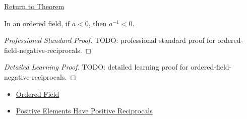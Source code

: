 \newpage
{}
\label{prf:ordered-field-negative-reciprocals}

\begin{remark*}[Return]
\hyperref[thm:ordered-field-negative-reciprocals]{Return to Theorem}
\end{remark*}

\begin{theorem*}
In an ordered field, if $a<0$, then $a^{-1}<0$.
\end{theorem*}

\begin{proof}[Professional Standard Proof]
\LRAProofBodyStart
TODO: professional standard proof for ordered-field-negative-reciprocals.
\end{proof}

\begin{proof}[Detailed Learning Proof]
\LRAProofBodyStart
TODO: detailed learning proof for ordered-field-negative-reciprocals.
\end{proof}

\begin{remark*}
\end{remark*}

\begin{dependencies}
\begin{itemize}
  \item \hyperref[def:ordered-field]{Ordered Field}
  \item \hyperref[thm:ordered-field-positive-reciprocals]{Positive Elements Have Positive Reciprocals}
\end{itemize}
\end{dependencies}

\clearpage
